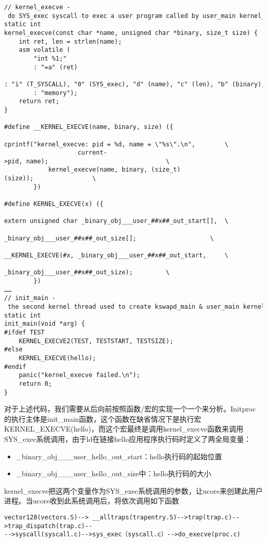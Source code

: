 \begin{lstlisting}
// kernel_execve - do SYS_exec syscall to exec a user program called by user_main kernel_thread
static int
kernel_execve(const char *name, unsigned char *binary, size_t size) {
    int ret, len = strlen(name);
    asm volatile (
        "int %1;"
        : "=a" (ret)
        : "i" (T_SYSCALL), "0" (SYS_exec), "d" (name), "c" (len), "b" (binary), "D" (size)
        : "memory");
    return ret;
}

#define __KERNEL_EXECVE(name, binary, size) ({                          \
            cprintf("kernel_execve: pid = %d, name = \"%s\".\n",        \
                    current->pid, name);                                \
            kernel_execve(name, binary, (size_t)(size));                \
        })

#define KERNEL_EXECVE(x) ({                                             \
            extern unsigned char _binary_obj___user_##x##_out_start[],  \
                _binary_obj___user_##x##_out_size[];                    \
            __KERNEL_EXECVE(#x, _binary_obj___user_##x##_out_start,     \
                            _binary_obj___user_##x##_out_size);         \
        })
……
// init_main - the second kernel thread used to create kswapd_main & user_main kernel threads
static int
init_main(void *arg) {
#ifdef TEST
    KERNEL_EXECVE2(TEST, TESTSTART, TESTSIZE);
#else
    KERNEL_EXECVE(hello);
#endif
    panic("kernel_execve failed.\n");
    return 0;
}
\end{lstlisting}

对于上述代码，我们需要从后向前按照函数/宏的实现一个一个来分析。Initproc的执行主体是init\_main函数，这个函数在缺省情况下是执行宏KERNEL\_EXECVE(hello)，而这个宏最终是调用kernel\_execve函数来调用SYS\_exec系统调用，由于ld在链接hello应用程序执行码时定义了两全局变量：

\begin{itemize}
\tightlist
\item
  \_binary\_obj\_\_\_user\_hello\_out\_start：hello执行码的起始位置
\item
  \_binary\_obj\_\_\_user\_hello\_out\_size中：hello执行码的大小
\end{itemize}

kernel\_execve把这两个变量作为SYS\_exec系统调用的参数，让ucore来创建此用户进程。当ucore收到此系统调用后，将依次调用如下函数

\begin{lstlisting}
vector128(vectors.S)--> __alltraps(trapentry.S)-->trap(trap.c)-->trap_dispatch(trap.c)--
-->syscall(syscall.c)-->sys_exec（syscall.c）-->do_execve(proc.c)
\end{lstlisting}

